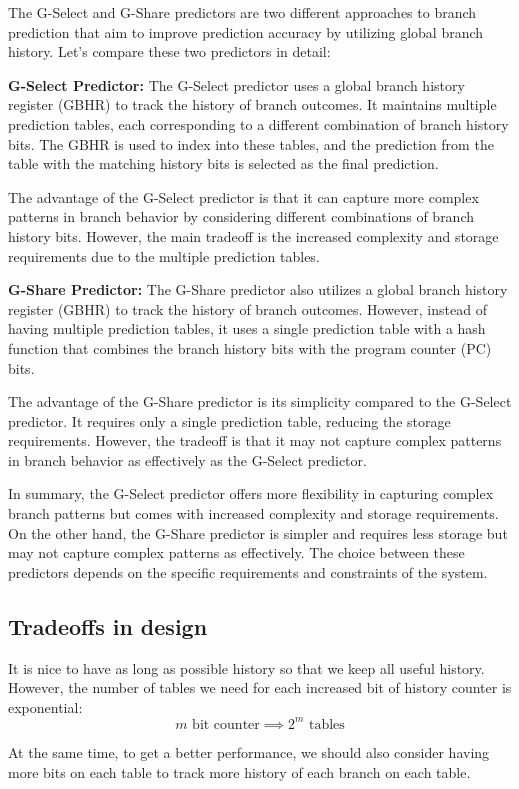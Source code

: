 \documentclass[letterpaper,12pt]{article}
\begin{document}
The G-Select and G-Share predictors are two different approaches to branch prediction that aim to improve prediction accuracy by utilizing global branch history. Let's compare these two predictors in detail:

\textbf{G-Select Predictor:} The G-Select predictor uses a global branch history register (GBHR) to track the history of branch outcomes. It maintains multiple prediction tables, each corresponding to a different combination of branch history bits. The GBHR is used to index into these tables, and the prediction from the table with the matching history bits is selected as the final prediction.

The advantage of the G-Select predictor is that it can capture more complex patterns in branch behavior by considering different combinations of branch history bits. However, the main tradeoff is the increased complexity and storage requirements due to the multiple prediction tables.

\textbf{G-Share Predictor:} The G-Share predictor also utilizes a global branch history register (GBHR) to track the history of branch outcomes. However, instead of having multiple prediction tables, it uses a single prediction table with a hash function that combines the branch history bits with the program counter (PC) bits.

The advantage of the G-Share predictor is its simplicity compared to the G-Select predictor. It requires only a single prediction table, reducing the storage requirements. However, the tradeoff is that it may not capture complex patterns in branch behavior as effectively as the G-Select predictor.

In summary, the G-Select predictor offers more flexibility in capturing complex branch patterns but comes with increased complexity and storage requirements. On the other hand, the G-Share predictor is simpler and requires less storage but may not capture complex patterns as effectively. The choice between these predictors depends on the specific requirements and constraints of the system.
\subsection{Tradeoffs in design}
It is nice to have as long as possible history so that we keep all useful history. However, the number of tables we need for each increased bit of history counter is exponential:
\[m\text{ bit counter}\implies 2^m \text{ tables}\]

At the same time, to get a better performance, we should also consider having more bits on each table to track more history of each branch on each table.
\end{document}
